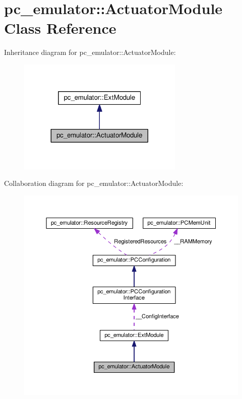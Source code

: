 \hypertarget{classpc__emulator_1_1ActuatorModule}{}\section{pc\+\_\+emulator\+:\+:Actuator\+Module Class Reference}
\label{classpc__emulator_1_1ActuatorModule}


Inheritance diagram for pc\+\_\+emulator\+:\+:Actuator\+Module\+:\nopagebreak
\begin{figure}[H]
\begin{center}
\leavevmode
\includegraphics[width=224pt]{classpc__emulator_1_1ActuatorModule__inherit__graph}
\end{center}
\end{figure}


Collaboration diagram for pc\+\_\+emulator\+:\+:Actuator\+Module\+:\nopagebreak
\begin{figure}[H]
\begin{center}
\leavevmode
\includegraphics[width=350pt]{classpc__emulator_1_1ActuatorModule__coll__graph}
\end{center}
\end{figure}

